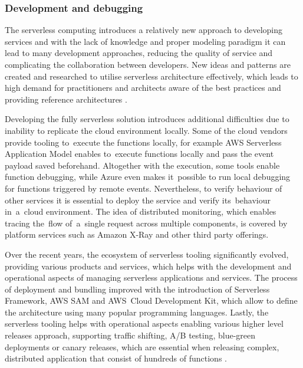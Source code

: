 \subsubsection{Development and debugging} \label{chapter:serverless-development-and-debugging}

The serverless computing introduces a relatively new approach to developing services and with the lack of knowledge and proper modeling paradigm it can lead to many development approaches, reducing the quality of service and complicating the collaboration between developers. New ideas and patterns are created and researched to utilise serverless architecture effectively, which leads to high demand for practitioners and architects aware of the best practices and providing reference architectures \cite{ServerlessComputingSurveyOfOpportunitiesChallengesApplications}.

Developing the fully serverless solution introduces additional difficulties due to inability to replicate the cloud environment locally. Some of the cloud vendors provide tooling to~execute the functions locally, for example AWS Serverless Application Model enables to~execute functions locally and pass the event payload saved beforehand. Altogether with the execution, some tools enable function debugging, while Azure even makes it~possible to run local debugging for functions triggered by remote events. Nevertheless, to verify behaviour of other services it is essential to deploy the service and verify its~behaviour in~a~cloud environment. The idea of distributed monitoring, which enables tracing the~flow of~a~single request across multiple components, is covered by platform services such as Amazon X-Ray and other third party offerings.

Over the recent years, the ecosystem of serverless tooling significantly evolved, providing various products and services, which helps with the development and operational aspects of managing serverless applications and services. The process of deployment and bundling improved with the introduction of Serverless Framework, AWS SAM and AWS~Cloud Development Kit, which allow to define the architecture using many popular programming languages. Lastly, the serverless tooling helps with operational aspects enabling various higher level releases approach, supporting traffic shifting, A/B testing, blue-green deployments or canary releases, which are essential when releasing complex, distributed application that consist of hundreds of functions \cite{MartinFowlerServerless}.

